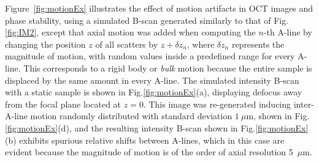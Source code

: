 Figure~\ref{fig:motionEx} illustrates the effect of motion artifacts in OCT images and phase stability, using a simulated B-scan generated similarly to that of Fig.\ref{fig:IM2}, except that axial motion was added when computing the $n$-th A-line by changing the position $z$ of all scatters by $z + \delta z_n$, where $\delta z_n$ represents the magnitude of motion, with random values inside a predefined range for every A-line. This corresponds to a rigid body or \textit{bulk} motion because the entire sample is displaced by the same amount in every A-line. The simulated intensity B-scan with a static sample is shown in Fig.\ref{fig:motionEx}(a), displaying defocus away from the focal plane located at $z=0$. This image was re-generated inducing inter-A-line motion randomly distributed with standard deviation $1~\mu$m, shown in Fig.\ref{fig:motionEx}(d), and the resulting intensity B-scan shown in Fig.\ref{fig:motionEx}(b) exhibits spurious relative shifts between A-lines, which in this case are evident because the magnitude of motion is of the order of axial resolution 5~$\mu$m.

